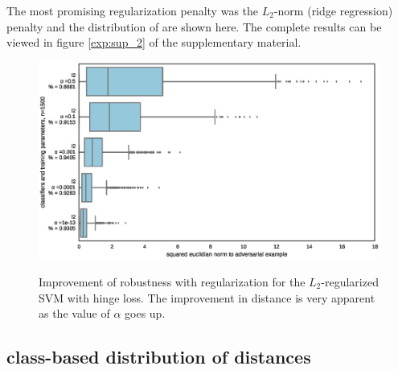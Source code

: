 \documentclass{article} %
\begin{document}
The most promising regularization penalty was the $L_2$-norm (ridge
regression) penalty and the distribution of are shown here. 
The complete results can be viewed in figure \ref{exp:sup_2} of the supplementary material.

\begin{figure}[h!]
\begin{center}
 \includegraphics[scale=0.5]{figs/experiment_2_l2}
 \label{res:exp2}
 \caption{\small Improvement of robustness with regularization for the $L_2$-regularized SVM with hinge loss. The improvement in distance is very apparent as the value of $\alpha$ goes up.}
 \end{center}
\end{figure}




\subsection{class-based distribution of distances}
\end{document}
